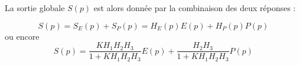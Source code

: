 \question{}
La sortie globale $S(p)$ est alors donnée par la combinaison des deux réponses :

\[
    S(p)=S_E(p)+S_P(p)=H_E(p)E(p) + H_P(p)P(p)
\]
ou encore
\[
    S(p)=\dfrac{KH_1H_2H_3}{1+KH_1H_2H_3}E(p)+\dfrac{H_2H_3}{1+KH_1H_2H_3} P(p)
\]



\question{}

